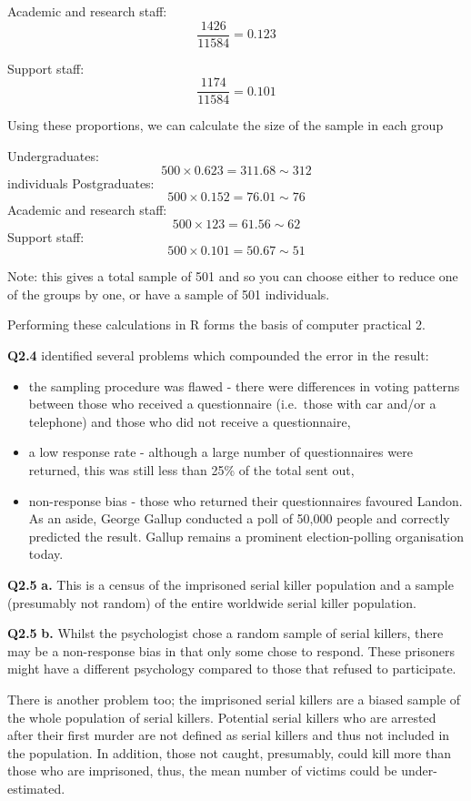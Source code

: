 \documentclass[
  oneside]{krantz}
\begin{document}
Academic and research staff: \[\frac{1426}{11584} = 0.123 \]

Support staff: \[\frac{1174}{11584} = 0.101 \]

Using these proportions, we can calculate the size of the sample in each group

Undergraduates: \[500 \times 0.623 = 311.68 \sim 312 \] individuals
Postgraduates: \[500 \times 0.152 = 76.01 \sim 76 \]
Academic and research staff: \[500 \times 123 = 61.56 \sim 62 \]
Support staff: \[500 \times 0.101 = 50.67 \sim 51 \]

Note: this gives a total sample of 501 and so you can choose either to reduce one of the groups by one, or have a sample of 501 individuals.

Performing these calculations in R forms the basis of computer practical 2.

\textbf{Q2.4} \citep{Squire1} identified several problems which compounded the error in the result:

\begin{itemize}
\item
  the sampling procedure was flawed - there were differences in voting patterns between those who received a questionnaire (i.e.~those with car and/or a telephone) and those who did not receive a questionnaire,
\item
  a low response rate - although a large number of questionnaires were returned, this was still less than 25\% of the total sent out,
\item
  non-response bias - those who returned their questionnaires favoured Landon.
  As an aside, George Gallup conducted a poll of 50,000 people and correctly predicted the result. Gallup remains a prominent election-polling organisation today.
\end{itemize}

\textbf{Q2.5} \textbf{a.} This is a census of the imprisoned serial killer population and a sample (presumably not random) of the entire worldwide serial killer population.

\textbf{Q2.5} \textbf{b.} Whilst the psychologist chose a random sample of serial killers, there may be a non-response bias in that only some chose to respond. These prisoners might have a different psychology compared to those that refused to participate.

There is another problem too; the imprisoned serial killers are a biased sample of the whole population of serial killers. Potential serial killers who are arrested after their first murder are not defined as serial killers and thus not included in the population. In addition, those not caught, presumably, could kill more than those who are imprisoned, thus, the mean number of victims could be under-estimated.
\end{document}
